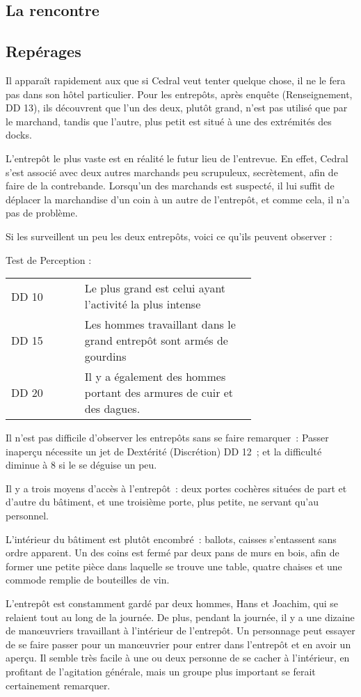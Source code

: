 \documentclass[a4paper,10pt,openany]{book}
\begin{document}
\begin{multicols}{2}
\section{La rencontre}
\subsection{Repérages}
Il apparaît rapidement aux \PJs que si Cedral veut tenter quelque chose, il ne le fera pas dans son hôtel particulier. Pour les entrepôts, après
enquête (Renseignement, DD 13), ils découvrent que l’un des deux, plutôt grand, n’est pas utilisé que par le marchand, tandis que l’autre, plus petit
est situé à une des extrémités des docks.\par L’entrepôt le plus vaste est en réalité le futur lieu de l’entrevue. En effet, Cedral s’est associé avec
deux autres marchands peu scrupuleux, secrètement, afin de faire de la contrebande. Lorsqu’un des marchands est suspecté, il lui suffit de déplacer la
marchandise d’un coin à un autre de l’entrepôt, et comme cela, il n’a pas de problème.\par Si les \PJs surveillent un peu les deux entrepôts, voici
ce qu’ils peuvent observer :
\begin{quotebox}
	Test de Perception :\par\noindent
	\begin{tabular}{lp{0.7\linewidth}}
		DD 10 & Le plus grand est celui ayant l’activité la plus intense\\
		DD 15 & Les hommes travaillant dans le grand entrepôt sont armés de gourdins\\
		DD 20 & Il y a également des hommes portant des armures de cuir et des dagues.
	\end{tabular}
\end{quotebox}
Il n’est pas difficile d’observer les entrepôts sans se faire remarquer : Passer inaperçu nécessite un jet de Dextérité (Discrétion) DD 12 ; et la
difficulté diminue à 8 si le \PJ se déguise un peu.\par Il y a trois moyens d’accès à l’entrepôt : deux portes cochères situées de part et
d’autre du bâtiment, et une troisième porte, plus petite, ne servant qu’au personnel.\par L’intérieur du bâtiment est plutôt encombré : ballots, caisses
s’entassent sans ordre apparent. Un des coins est fermé par deux pans de murs en bois, afin de former une petite pièce dans laquelle se trouve une
table, quatre chaises et une commode remplie de bouteilles de vin.\par L’entrepôt est constamment gardé par deux hommes, Hans et Joachim, qui se
relaient tout au long de la journée. De plus, pendant la journée, il y a une dizaine de manœuvriers travaillant à l’intérieur de l’entrepôt. Un
personnage peut essayer de se faire passer pour un manœuvrier pour entrer dans l’entrepôt et en avoir un aperçu. Il semble très facile à une ou deux
personne de se cacher à l’intérieur, en profitant de l’agitation générale, mais un groupe plus important se ferait certainement remarquer.

\end{multicols}
\end{document}
